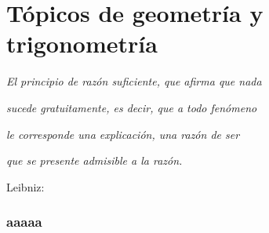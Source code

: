 
\chapter{Tópicos de geometría y trigonometría }

\PartialToc

\hypersetup{linkcolor=ptctitle}

\vspace*{0.5cm}
 
\begin{flushright}
\textit{\footnotesize{}El principio de razón suficiente, que afirma
que nada}
\par\end{flushright}{\footnotesize \par}

\begin{flushright}
\textit{\footnotesize{}sucede gratuitamente, es decir, que a todo
fenómeno }
\par\end{flushright}{\footnotesize \par}

\begin{flushright}
\textit{\footnotesize{}le corresponde una explicación, una razón de
ser }
\par\end{flushright}{\footnotesize \par}

\begin{flushright}
\textit{\footnotesize{}que se presente admisible a la razón. }
\par\end{flushright}{\footnotesize \par}

\begin{flushright}
{\small{} }Leibniz: 
\par\end{flushright}

\vspace*{-1mm}


\subsection{aaaaa}
